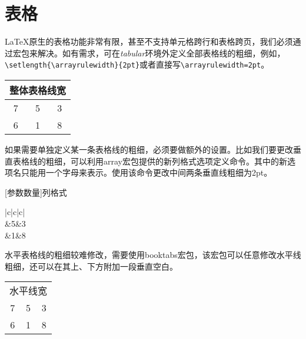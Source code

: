 \section{表格}
\LaTeX 原生的表格功能非常有限，甚至不支持单元格跨行和表格跨页，我们必须通过宏包来解决。如有需求，可在\emph{tabular}环境外定义全部表格线的粗细，例如，\lstinline|\setlength{\arrayrulewidth}{2pt}|或者直接写\lstinline|\arrayrulewidth=2pt|。

\begin{codeshow}
\centering
\arrayrulewidth=1pt%
\begin{tabular}
    {|c|c|c|}
    \hline
    \multicolumn{3}{|c|}{整体表格线宽}\\
    \hline
    7 & 5 & 3 \\
    \hline
    6 & 1 & 8 \\
    \hline
\end{tabular}
\end{codeshow}

如果需要单独定义某一条表格线的粗细，必须要做额外的设置。比如我们要更改垂直表格线的粗细，可以利用array宏包提供的新列格式选项定义命令。其中的新选项名只能用一个字母来表示。使用该命令更改中间两条垂直线粗细为2pt。

\begin{latex}
\newcolumntype{新选项名称}[参数数量]{列格式}
\end{latex}

\begin{codeshow}
\centering
{}
\begin{tabular}
    {|c|c|c|}
    \hline
    \\
    &5&3\\
    &1&8\\
    \hline
\end{tabular}
\end{codeshow}

水平表格线的粗细较难修改，需要使用booktabs宏包，该宏包可以任意修改水平线粗细，还可以在其上、下方附加一段垂直空白。

\begin{codeshow}
\centering
\begin{tabular}
    {|c|c|c|}
    \hline 
    \multicolumn{3}{|c|}{水平线宽}\\
    \specialrule{2pt}{0pt}{0pt}
    7&5&3\\
    \hline
    6&1&8\\
    \hline
\end{tabular}
\end{codeshow}

